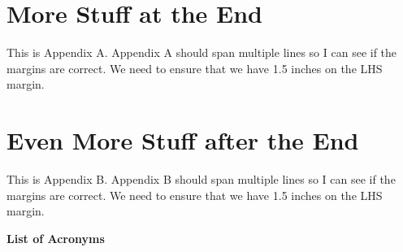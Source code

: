 \documentclass[11pt,ms]{uddissert2019}
\begin{document}
\begin{appendices}
	\appendix
	
    \chapter{More Stuff at the End}

    This is Appendix A.  Appendix A should span multiple lines so I can see if the margins are correct.  We need to ensure that we have 1.5 inches on the LHS margin.

    \chapter{Even More Stuff after the End}

    This is Appendix B.  Appendix B should span multiple lines so I can see if the margins are correct.  We need to ensure that we have 1.5 inches on the LHS margin.
\end{appendices}

\clearpage
\begin{center}
	\Large{\textbf{List of Acronyms}}
\end{center}

\end{document}
